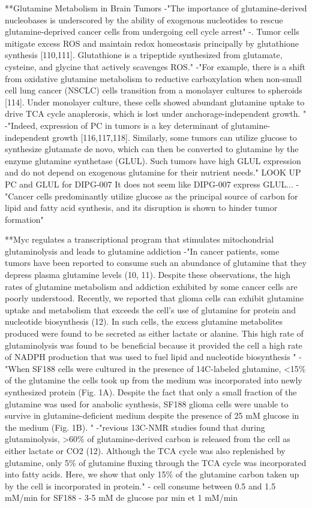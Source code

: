 \documentclass[11pt,a4paper]{article}
\begin{document}
**Glutamine Metabolism in Brain Tumors
-"The importance of glutamine-derived nucleobases is underscored by the ability of exogenous nucleotides to rescue glutamine-deprived cancer cells from undergoing cell cycle arrest"
-. Tumor cells mitigate excess ROS and maintain redox homeostasis principally by glutathione synthesis [110,111]. Glutathione is a tripeptide synthesized from glutamate, cysteine, and glycine that actively scavenges ROS."
-"For example, there is a shift from oxidative glutamine metabolism to reductive carboxylation when non-small cell lung cancer (NSCLC) cells transition from a monolayer cultures to spheroids [114]. Under monolayer culture, these cells showed abundant glutamine uptake to drive TCA cycle anaplerosis, which is lost under anchorage-independent growth. "
-"Indeed, expression of PC in tumors is a key determinant of glutamine-independent growth [116,117,118]. Similarly, some tumors can utilize glucose to synthesize glutamate de novo, which can then be converted to glutamine by the enzyme glutamine synthetase (GLUL). Such tumors have high GLUL expression and do not depend on exogenous glutamine for their nutrient needs." LOOK UP PC and GLUL for DIPG-007 It does not seem like DIPG-007 express GLUL...
-"Cancer cells predominantly utilize glucose as the principal source of carbon for lipid and fatty acid synthesis, and its disruption is shown to hinder tumor formation"


**Myc regulates a transcriptional program that stimulates mitochondrial glutaminolysis and leads to glutamine addiction
-"In cancer patients, some tumors have been reported to consume such an abundance of glutamine that they depress plasma glutamine levels (10, 11). Despite these observations, the high rates of glutamine metabolism and addiction exhibited by some cancer cells are poorly understood. Recently, we reported that glioma cells can exhibit glutamine uptake and metabolism that exceeds the cell's use of glutamine for protein and nucleotide biosynthesis (12). In such cells, the excess glutamine metabolites produced were found to be secreted as either lactate or alanine. This high rate of glutaminolysis was found to be beneficial because it provided the cell a high rate of NADPH production that was used to fuel lipid and nucleotide biosynthesis "
-"When SF188 cells were cultured in the presence of 14C-labeled glutamine, <15\% of the glutamine the cells took up from the medium was incorporated into newly synthesized protein (Fig. 1A). Despite the fact that only a small fraction of the glutamine was used for anabolic synthesis, SF188 glioma cells were unable to survive in glutamine-deficient medium despite the presence of 25 mM glucose in the medium (Fig. 1B). "
-"revious 13C-NMR studies found that during glutaminolysis, >60\% of glutamine-derived carbon is released from the cell as either lactate or CO2 (12). Although the TCA cycle was also replenished by glutamine, only 5\% of glutamine fluxing through the TCA cycle was incorporated into fatty acids. Here, we show that only 15\% of the glutamine carbon taken up by the cell is incorporated in protein."
- cell consume between 0.5 and 1.5 mM/min for SF188
- 3-5 mM de glucose par min et 1 mM/min
\end{document}
